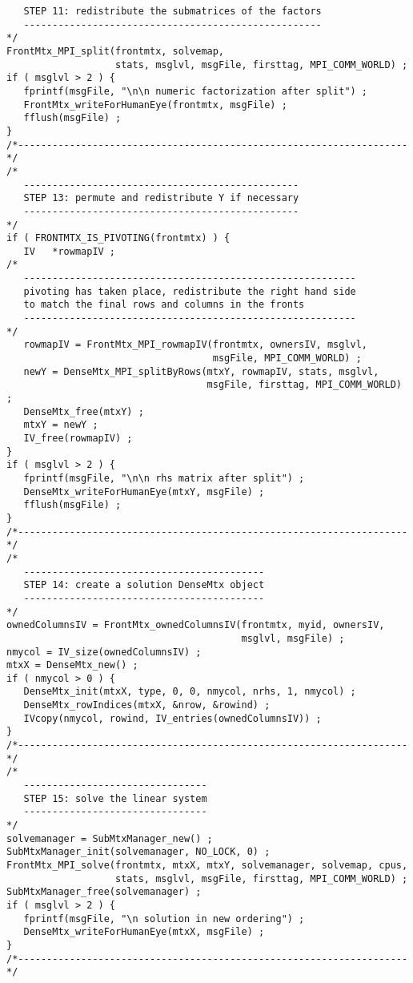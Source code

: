 \begin{verbatim}
   STEP 11: redistribute the submatrices of the factors
   ----------------------------------------------------
*/
FrontMtx_MPI_split(frontmtx, solvemap, 
                   stats, msglvl, msgFile, firsttag, MPI_COMM_WORLD) ;
if ( msglvl > 2 ) {
   fprintf(msgFile, "\n\n numeric factorization after split") ;
   FrontMtx_writeForHumanEye(frontmtx, msgFile) ;
   fflush(msgFile) ;
}
/*--------------------------------------------------------------------*/
/*
   ------------------------------------------------
   STEP 13: permute and redistribute Y if necessary
   ------------------------------------------------
*/
if ( FRONTMTX_IS_PIVOTING(frontmtx) ) {
   IV   *rowmapIV ;
/*
   ----------------------------------------------------------
   pivoting has taken place, redistribute the right hand side
   to match the final rows and columns in the fronts
   ----------------------------------------------------------
*/
   rowmapIV = FrontMtx_MPI_rowmapIV(frontmtx, ownersIV, msglvl,
                                    msgFile, MPI_COMM_WORLD) ;
   newY = DenseMtx_MPI_splitByRows(mtxY, rowmapIV, stats, msglvl, 
                                   msgFile, firsttag, MPI_COMM_WORLD) ;
   DenseMtx_free(mtxY) ;
   mtxY = newY ;
   IV_free(rowmapIV) ;
}
if ( msglvl > 2 ) {
   fprintf(msgFile, "\n\n rhs matrix after split") ;
   DenseMtx_writeForHumanEye(mtxY, msgFile) ;
   fflush(msgFile) ;
}
/*--------------------------------------------------------------------*/
/*
   ------------------------------------------
   STEP 14: create a solution DenseMtx object
   ------------------------------------------
*/
ownedColumnsIV = FrontMtx_ownedColumnsIV(frontmtx, myid, ownersIV,
                                         msglvl, msgFile) ;
nmycol = IV_size(ownedColumnsIV) ;
mtxX = DenseMtx_new() ;
if ( nmycol > 0 ) {
   DenseMtx_init(mtxX, type, 0, 0, nmycol, nrhs, 1, nmycol) ;
   DenseMtx_rowIndices(mtxX, &nrow, &rowind) ;
   IVcopy(nmycol, rowind, IV_entries(ownedColumnsIV)) ;
}
/*--------------------------------------------------------------------*/
/*
   --------------------------------
   STEP 15: solve the linear system
   --------------------------------
*/
solvemanager = SubMtxManager_new() ;
SubMtxManager_init(solvemanager, NO_LOCK, 0) ;
FrontMtx_MPI_solve(frontmtx, mtxX, mtxY, solvemanager, solvemap, cpus, 
                   stats, msglvl, msgFile, firsttag, MPI_COMM_WORLD) ;
SubMtxManager_free(solvemanager) ;
if ( msglvl > 2 ) {
   fprintf(msgFile, "\n solution in new ordering") ;
   DenseMtx_writeForHumanEye(mtxX, msgFile) ;
}
/*--------------------------------------------------------------------*/

\end{verbatim}
